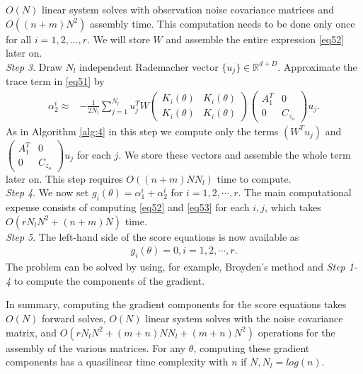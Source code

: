\documentclass[article,ij4uq]{ij4uq}              %
\begin{document}
\begin{algorithm}[!ht]
$O(N)$ linear system solves with observation noise covariance matrices  and $O((n+m)N^{2})$ assembly time. This computation needs  to be done only once for all $i=1,2,\ldots,r$. We will store $W$ and assemble the entire expression \eqref{eq52} later on.\\
\textit{Step 3}. Draw $N_{l}$ independent Rademacher vector $\{u_{j}\} \in \mathbb{R}^{d+D}$. Approximate the trace term in \eqref{eq51} by
\begin{align}
    \alpha_{2}^{i}\approx&-\frac{1}{2N_{l}}\sum_{j=1}^{N_{l}}u_{j}^{T}W\begin{pmatrix}K_{i}(\theta) & K_{i}(\theta)\\K_{i}(\theta) & K_{i}(\theta)\end{pmatrix}\begin{pmatrix}A_{1}^{T} & 0\\0 & C_{z_{o}}\end{pmatrix}u_{j}.\label{eq53}
\end{align}
As in Algorithm \ref{alg:4} in this step we  compute only the terms $(W^{T}u_{j})$
and $\begin{pmatrix}A_{1}^{T} & 0\\0 & C_{z_{o}}\end{pmatrix}u_{j}$ for each $j$. We store these vectors and assemble the whole term later on. This step requires $O((n+m)NN_{l})$ time to compute.\\
\textit{Step 4}. We now set $g_{i}(\theta)=\alpha_{1}^{i}+\alpha_{2}^{i}$ for $i=1,2,\cdots,r$. The main computational expense consists of computing \eqref{eq52} and \eqref{eq53} for each $i,j$, which takes $O(rN_{l}N^{2}+(n+m)N)$ time.
\\
\textit{Step 5}. The left-hand side of the score equations is now available as
\begin{align}
    g_{i}(\theta)=0, i=1,2,\cdots,r.\label{eq54}
\end{align}
The problem can be  solved by using, for example, Broyden's method and \textit{Step 1-4} to compute the components of the gradient.
\end{algorithm}

\par In summary, computing the gradient components for the score equations takes $O(N)$ forward solves, $O(N)$ linear system solves with the noise covariance matrix,  and $O(rN_{l}N^{2}+(m+n)NN_{l}+(m+n)N^{2})$ operations for the assembly of the various matrices. For any $\theta$, computing these gradient components has a quasilinear time complexity with $n$ if $N,N_{l}=log(n)$. 
\end{document}
